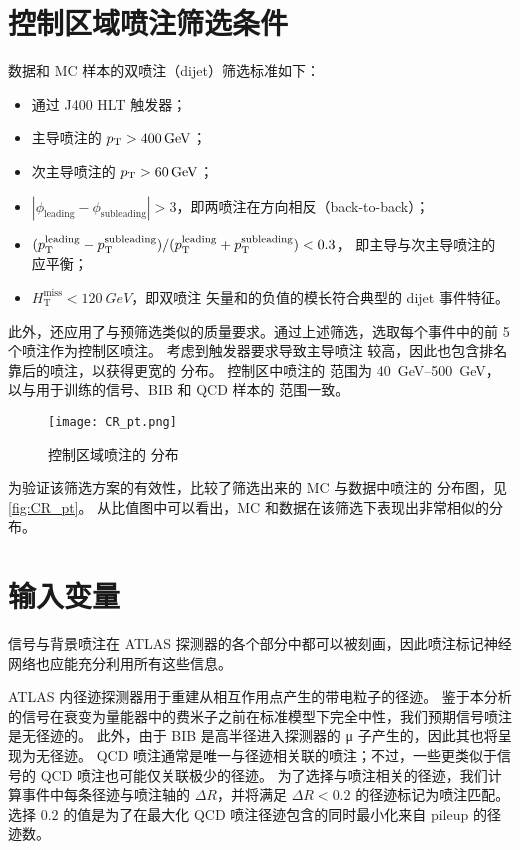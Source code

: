\section{控制区域喷注筛选条件}
\label{cpm:CR_jet_selection}

数据和 MC 样本的双喷注（dijet）筛选标准如下：
\begin{itemize}
      \item 通过 J400 HLT 触发器；
      \item 主导喷注的 $p_{\text{T}} > \SI{400}{GeV}$；
      \item 次主导喷注的 $p_{\text{T}} > \SI{60}{GeV}$；
      \item $|\phi_{\text{leading}} - \phi_{\text{subleading}}| > 3$，即两喷注在方向相反（back-to-back）；
      \item $(p_{\text{T}}^{\text{leading}} - p_{\text{T}}^{\text{subleading}}) / (p_{\text{T}}^{\text{leading}} + p_{\text{T}}^{\text{subleading}}) < 0.3$，
            即主导与次主导喷注的 \pt 应平衡；
      \item $H_\text{T}^\text{miss} < \SI{120}{GeV}$，即双喷注 \pt 矢量和的负值的模长符合典型的 dijet 事件特征。
\end{itemize}

此外，还应用了与预筛选类似的质量要求。通过上述筛选，选取每个事件中的前 5 个喷注作为控制区喷注。
考虑到触发器要求导致主导喷注 \pt 较高，因此也包含排名靠后的喷注，以获得更宽的 \pt 分布。
控制区中喷注的 \pt 范围为 \SI{40}{GeV}–\SI{500}{GeV}，以与用于训练的信号、BIB 和 QCD 样本的 \pt 范围一致。

\begin{figure}[ht]
      \centering
      \texttt{[image: CR\_pt.png]}
      \caption{控制区域喷注的 \pt 分布}
      \label{fig:CR_pt}
\end{figure}

为验证该筛选方案的有效性，比较了筛选出来的 MC 与数据中喷注的 \pt 分布图，见\autoref{fig:CR_pt}。
从比值图中可以看出，MC 和数据在该筛选下表现出非常相似的分布。


\section{输入变量}
\label{cpm:NN_variables}

信号与背景喷注在 ATLAS 探测器的各个部分中都可以被刻画，因此喷注标记神经网络也应能充分利用所有这些信息。

ATLAS 内径迹探测器用于重建从相互作用点产生的带电粒子的径迹。
鉴于本分析的信号在衰变为量能器中的费米子之前在标准模型下完全中性，我们预期信号喷注是无径迹的。
此外，由于 BIB 是高半径进入探测器的 μ 子产生的，因此其也将呈现为无径迹。
QCD 喷注通常是唯一与径迹相关联的喷注；不过，一些更类似于信号的 QCD 喷注也可能仅关联极少的径迹。
为了选择与喷注相关的径迹，我们计算事件中每条径迹与喷注轴的 $\Delta R$，并将满足 $\Delta R < 0.2$ 的径迹标记为喷注匹配。
选择 $0.2$ 的值是为了在最大化 QCD 喷注径迹包含的同时最小化来自 pileup 的径迹数。

